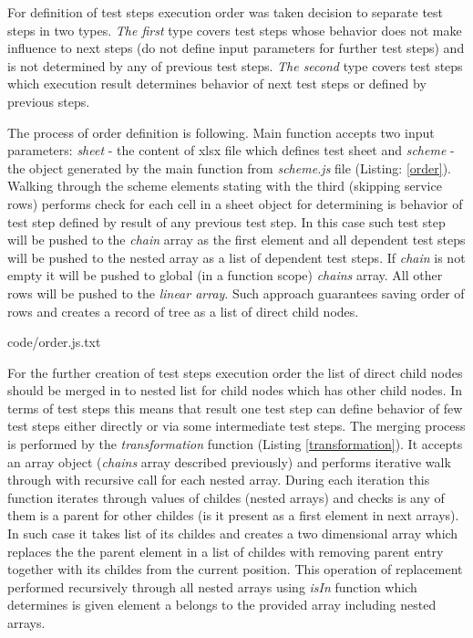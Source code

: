 For definition of test steps execution order was taken decision to separate test steps in two types. \textit{The first} type covers test steps whose behavior does not make influence to next steps (do not define input parameters for further test steps) and is not determined by any of previous test steps. \textit{The second} type covers test steps which execution result determines behavior of next test steps or defined by previous steps.

%
The process of order definition is following. Main function accepts two input parameters: \textit{sheet} - the content of xlsx file which defines test sheet and \textit{scheme} - the object generated by the main function from \textit{scheme.js} file (Listing: \ref{order}). Walking through the scheme elements stating with the third (skipping service rows) performs check for each cell in a sheet object for determining is behavior of test step defined by result of any previous test step. In this case such test step will be pushed to the \textit{chain} array as the first element and all dependent test steps will be pushed to the nested array as a list of dependent test steps. If \textit{chain} is not empty it will be pushed to global (in a function scope) \textit{chains}  array. All other rows will be pushed to the \textit{linear array}. Such approach guarantees saving order of rows and creates a record of tree as a list of direct child nodes.



{code/order.js.txt}

For the further creation of test steps execution order the list of direct child nodes should be merged in to nested list for child nodes which has other child nodes. In terms of test steps this means that result one test step can define behavior of few test steps either directly or via some intermediate test steps. 
The merging process is performed by the \textit{transformation} function (Listing \ref{transformation}). It accepts an array object (\textit{chains} array described previously) and performs iterative walk through with recursive call for each nested array. During each iteration this function iterates through values of childes (nested arrays) and checks is any of them is a parent for other childes (is it present as a first element in next arrays). In such case it takes list of its childes and creates a two dimensional array which replaces the the parent element in a list of childes with removing parent entry together with its childes from the current position. This operation of replacement performed recursively through all nested arrays using \textit{isIn} function which determines is given element a belongs to the provided array including nested arrays.

